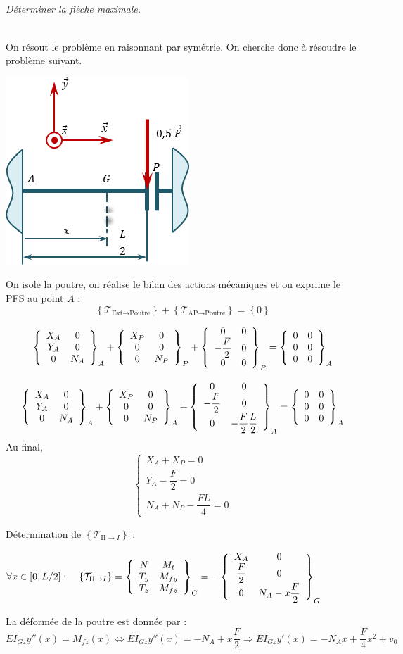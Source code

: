 \documentclass[10pt,fleqn]{article} %
\begin{document}
\setcounter{subparagraph}{0}
\subparagraph{}
\textit{Déterminer la flèche maximale.}
\ifprof
\begin{corrige}
~\\
On résout le problème en raisonnant par symétrie. On cherche donc à résoudre le problème suivant.
\begin{center}
\includegraphics[width=.48\linewidth]{images/fig_05}
\end{center}

On isole la poutre, on réalise le bilan des actions mécaniques et on exprime le PFS au point $A$ :
$$
\left\{\mathcal{T}_{\text{Ext} \rightarrow \text{Poutre}}  \right\} + 
\left\{\mathcal{T}_{\text{AP} \rightarrow \text{Poutre}}  \right\} =
\left\{0 \right\} 
$$ 


$$
\torseurcol{X_A}{Y_A}{0}{0}{0}{N_A}{A} + 
\torseurcol{X_P}{0}{0}{0}{0}{N_P}{P} + 
\torseurcol{0}{-\dfrac{F}{2}}{0}{0}{0}{0}{P} =  
\torseurcol{0}{0}{0}{0}{0}{0}{A}
$$


$$
\torseurcol{X_A}{Y_A}{0}{0}{0}{N_A}{A} + 
\torseurcol{X_P}{0}{0}{0}{0}{N_P}{A} + 
\torseurcol{0}{-\dfrac{F}{2}}{0}{0}{0}{-\dfrac{F}{2}\dfrac{L}{2}}{A} =  
\torseurcol{0}{0}{0}{0}{0}{0}{A}
$$
Au final, 
$$
\left\{
\begin{array}{l}
X_A +X_P= 0\\
Y_A - \dfrac{F}{2}= 0 \\
N_A + N_P -\dfrac{FL}{4} = 0
\end{array}
\right.
$$


Détermination de $ \left\{\mathcal{T}_{\text{II}\rightarrow I}\right\}$ :

$
\forall x \in [0,L/2] : \quad 
\left\{\mathcal{T}_{\text{II}\rightarrow I}\right\} 
= \torseurcol{N}{T_y}{T_z}{M_t}{M_{fy}}{M_{fz}}{G}
= -  \torseurcol{X_A}{\dfrac{F}{2}}{0}{0}{0}{N_A-x\dfrac{F}{2}}{G} 
$


La déformée de la poutre est donnée par : 
$$
EI_{Gz}y''(x) = M_{fz}(x) 
\Longleftrightarrow EI_{Gz}y''(x) = -N_A+x\dfrac{F}{2}
\Rightarrow EI_{Gz}y'(x) = -N_Ax+\dfrac{F}{4}x^2 + v_0
$$


\end{corrige}
\end{document}
